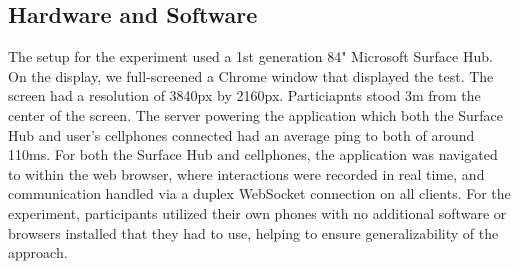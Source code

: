 \subsection{Hardware and Software}

The setup for the experiment used a 1st generation 84" Microsoft Surface Hub. On
the display, we full-screened a Chrome window that displayed the test. The screen
had a resolution of 3840px by 2160px. Particiapnts stood 3m from the center
of the screen. The server powering the application which
both the Surface Hub and user's cellphones connected had an average ping to both
of around 110ms. For both the Surface Hub and cellphones, the application was
navigated to within the web browser, where interactions were recorded in
real time, and communication handled via a duplex WebSocket connection on all
clients. For the experiment, participants utilized their own phones with no
additional software or browsers installed that they had to use, helping to ensure
generalizability of the approach.